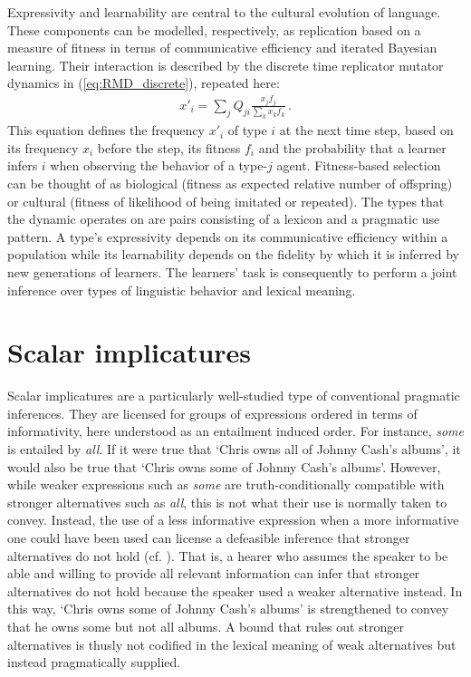 \documentclass[a4paper]{article}
\begin{document}
Expressivity and learnability are central to the cultural evolution of language. These
components can be modelled, respectively, as replication based on a measure of fitness in terms
of communicative efficiency and iterated Bayesian learning. Their interaction is described by
the discrete time replicator mutator dynamics in (\ref{eq:RMD_discrete}), repeated here:
\begin{align*}
  x'_i = \sum_j Q_{ji} \frac{x_jf_j}{\sum_k x_k f_k}\,.
\end{align*}
This equation defines the frequency $x'_i$ of type $i$ at the next time step, based on its
frequency $x_i$ before the step, its fitness $f_i$ and the probability that a learner infers
$i$ when observing the behavior of a type-$j$ agent. Fitness-based selection can be thought of
as biological (fitness as expected relative number of offspring) or cultural (fitness of
likelihood of being imitated or repeated). The types that the dynamic operates on are pairs
consisting of a lexicon and a pragmatic use pattern. A type's expressivity depends on its
communicative efficiency within a population while its learnability depends on the fidelity by
which it is inferred by new generations of learners. The learners' task is consequently to
perform a joint inference over types of linguistic behavior and lexical meaning.


\section{Scalar implicatures}\label{sec:si-case-study}
%
Scalar implicatures are a particularly well-studied type of conventional pragmatic inferences. They are licensed for groups of expressions ordered in terms of informativity, here understood as an entailment induced order. For instance, {\em some} is entailed by {\em all}. If it were true that `Chris owns all of Johnny Cash's albums', it would also be true that `Chris owns some of Johnny Cash's albums'. However, while weaker expressions such as {\em some} are truth-conditionally compatible with stronger alternatives such as {\em all}, this is not what their use is normally taken to convey. Instead, the use of a less informative expression when a more informative one could have been used can license a defeasible inference that stronger alternatives do not hold (cf. \citealt{horn:1972,gazdar:1979}). That is, a hearer who assumes the speaker to be able and willing to provide all relevant information can infer that stronger alternatives do not hold because the speaker used a weaker alternative instead. In this way, `Chris owns some of Johnny Cash's albums' is strengthened to convey that he owns some but not all albums. A bound that rules out stronger alternatives is thusly not codified in the lexical meaning of weak alternatives but instead pragmatically supplied.
\end{document}

